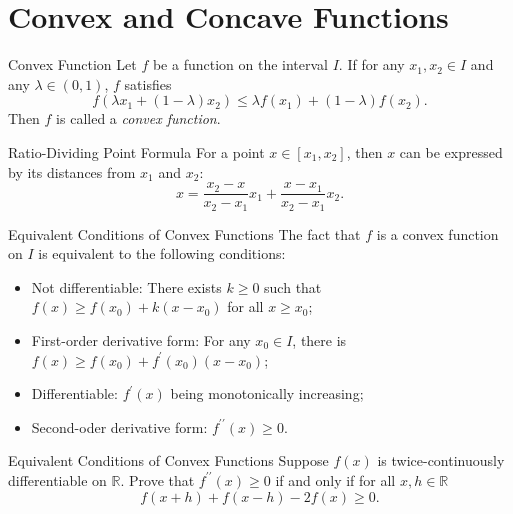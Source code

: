 \section{Convex and Concave Functions}

\begin{definition}{Convex Function}{}
  Let $f$ be a function on the interval $I$.
  If for any $x_1, x_2 \in I$ and any $\lambda \in (0, 1)$,
  $f$ satisfies
  \begin{equation}
    f \left( \lambda x_1 + (1-\lambda)x_2 \right) \leq \lambda f(x_1) + (1-\lambda)f(x_2).
  \end{equation}
  Then $f$ is called a \emph{convex function}.
\end{definition}

\begin{lemma}{Ratio-Dividing Point Formula}{}
  For a point $x \in [x_1, x_2]$, then $x$ can be expressed by
  its distances from $x_1$ and $x_2$:
  \begin{equation}
    x = \frac{x_2 - x}{x_2 - x_1}x_1 + \frac{x - x_1}{x_2 - x_1}x_2.
  \end{equation}
\end{lemma}

\begin{proposition}{Equivalent Conditions of Convex Functions}{}
  The fact that $f$ is a convex function on $I$ is equivalent to
  the following conditions:
  \begin{itemize}
  \item Not differentiable: There exists $k \geq 0$ such that $f(x) \geq f(x_0)
    + k(x - x_0)$ for all $x \geq x_0$;
  \item First-order derivative form: For any $x_0 \in I$,
    there is $f(x) \geq f(x_0) + f^{\prime}(x_0) (x - x_0)$;
  \item Differentiable: $f^{\prime}(x)$ being monotonically increasing;
  \item Second-oder derivative form: $f^{\prime\prime}(x) \geq 0$.
  \end{itemize}
\end{proposition}

\begin{example}{Equivalent Conditions of Convex Functions}{}
  Suppose $f(x)$ is twice-continuously differentiable on $\mathbb{R}$.
  Prove that $f^{\prime\prime}(x) \geq 0$ if and only if for all $x,h \in \mathbb{R}$
  \begin{equation}
    f(x+h) + f(x-h) -2f(x) \geq 0.
  \end{equation}
\end{example}


